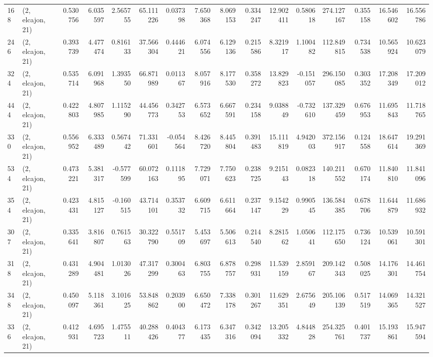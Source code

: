 \begin{tabular}{llrrrrrrrrrrrrrr}
168 &  (2, elcajon, 21) &   0.530756 &   6.035597 &   2.565755 &    65.111226 &   0.037398 &   7.650368 &   8.069153 &  0.334247 &  12.902411 &   0.580618 &   274.127167 &  0.355158 &  16.546602 &  16.556786 \\
246 &  (2, elcajon, 21) &   0.393739 &   4.477474 &   0.816133 &    37.566304 &   0.444621 &   6.074556 &   6.129136 &  0.215586 &   8.321917 &   1.100482 &   112.849815 &  0.734538 &  10.565924 &  10.623079 \\
324 &  (2, elcajon, 21) &   0.535714 &   6.091968 &   1.393550 &    66.871989 &   0.011367 &   8.057916 &   8.177530 &  0.358272 &  13.829823 &  -0.151057 &   296.150085 &  0.303352 &  17.208349 &  17.209012 \\
444 &  (2, elcajon, 21) &   0.422803 &   4.807985 &   1.115290 &    44.456773 &   0.342753 &   6.573652 &   6.667591 &  0.234158 &   9.038849 &  -0.732610 &   137.329459 &  0.676953 &  11.695843 &  11.718765 \\
330 &  (2, elcajon, 21) &   0.556952 &   6.333489 &   0.567442 &    71.331601 &  -0.054564 &   8.426720 &   8.445804 &  0.391483 &  15.111819 &   4.942003 &   372.156917 &  0.124558 &  18.647614 &  19.291369 \\
534 &  (2, elcajon, 21) &   0.473221 &   5.381317 &  -0.577599 &    60.072163 &   0.111895 &   7.729071 &   7.750623 &  0.238725 &   9.215143 &   0.082318 &   140.211552 &  0.670174 &  11.840810 &  11.841096 \\
354 &  (2, elcajon, 21) &   0.423431 &   4.815127 &  -0.160515 &    43.714101 &   0.353732 &   6.609715 &   6.611664 &  0.237147 &   9.154229 &   0.990545 &   136.584385 &  0.678706 &  11.644879 &  11.686932 \\
307 &  (2, elcajon, 21) &   0.335641 &   3.816807 &   0.761563 &    30.322790 &   0.551709 &   5.453697 &   5.506613 &  0.214540 &   8.281562 &   1.050641 &   112.175650 &  0.736124 &  10.539061 &  10.591301 \\
318 &  (2, elcajon, 21) &   0.431289 &   4.904481 &   1.013026 &    47.317299 &   0.300463 &   6.803755 &   6.878757 &  0.298931 &  11.539159 &   2.859167 &   209.142343 &  0.508025 &  14.176301 &  14.461754 \\
348 &  (2, elcajon, 21) &   0.450097 &   5.118361 &   3.101625 &    53.848862 &   0.203900 &   6.650472 &   7.338178 &  0.301267 &  11.629351 &   2.675649 &   205.106139 &  0.517519 &  14.069365 &  14.321527 \\
336 &  (2, elcajon, 21) &   0.412931 &   4.695723 &   1.475511 &    40.288426 &   0.404377 &   6.173435 &   6.347316 &  0.342094 &  13.205332 &   4.844828 &   254.325761 &  0.401737 &  15.193861 &  15.947594 \\

\end{tabular}

